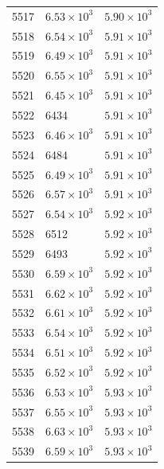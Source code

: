 \begin{table}[H]
\begin{tabular}{lll}
5517 & $\displaystyle 6.53 \times 10^{3}$ & $\displaystyle 5.90 \times 10^{3}$ \\
5518 & $\displaystyle 6.54 \times 10^{3}$ & $\displaystyle 5.91 \times 10^{3}$ \\
5519 & $\displaystyle 6.49 \times 10^{3}$ & $\displaystyle 5.91 \times 10^{3}$ \\
5520 & $\displaystyle 6.55 \times 10^{3}$ & $\displaystyle 5.91 \times 10^{3}$ \\
5521 & $\displaystyle 6.45 \times 10^{3}$ & $\displaystyle 5.91 \times 10^{3}$ \\
5522 & 6434 & $\displaystyle 5.91 \times 10^{3}$ \\
5523 & $\displaystyle 6.46 \times 10^{3}$ & $\displaystyle 5.91 \times 10^{3}$ \\
5524 & 6484 & $\displaystyle 5.91 \times 10^{3}$ \\
5525 & $\displaystyle 6.49 \times 10^{3}$ & $\displaystyle 5.91 \times 10^{3}$ \\
5526 & $\displaystyle 6.57 \times 10^{3}$ & $\displaystyle 5.91 \times 10^{3}$ \\
5527 & $\displaystyle 6.54 \times 10^{3}$ & $\displaystyle 5.92 \times 10^{3}$ \\
5528 & 6512 & $\displaystyle 5.92 \times 10^{3}$ \\
5529 & 6493 & $\displaystyle 5.92 \times 10^{3}$ \\
5530 & $\displaystyle 6.59 \times 10^{3}$ & $\displaystyle 5.92 \times 10^{3}$ \\
5531 & $\displaystyle 6.62 \times 10^{3}$ & $\displaystyle 5.92 \times 10^{3}$ \\
5532 & $\displaystyle 6.61 \times 10^{3}$ & $\displaystyle 5.92 \times 10^{3}$ \\
5533 & $\displaystyle 6.54 \times 10^{3}$ & $\displaystyle 5.92 \times 10^{3}$ \\
5534 & $\displaystyle 6.51 \times 10^{3}$ & $\displaystyle 5.92 \times 10^{3}$ \\
5535 & $\displaystyle 6.52 \times 10^{3}$ & $\displaystyle 5.92 \times 10^{3}$ \\
5536 & $\displaystyle 6.53 \times 10^{3}$ & $\displaystyle 5.93 \times 10^{3}$ \\
5537 & $\displaystyle 6.55 \times 10^{3}$ & $\displaystyle 5.93 \times 10^{3}$ \\
5538 & $\displaystyle 6.63 \times 10^{3}$ & $\displaystyle 5.93 \times 10^{3}$ \\
5539 & $\displaystyle 6.59 \times 10^{3}$ & $\displaystyle 5.93 \times 10^{3}$ \\

\end{tabular}
\end{table}
